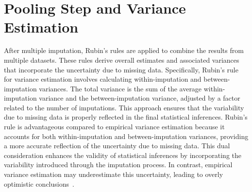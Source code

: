 \section{Pooling Step and Variance Estimation}
After multiple imputation, Rubin's rules are applied to combine the results from multiple datasets.
These rules derive overall estimates and associated variances that incorporate the uncertainty due to missing data.
Specifically, Rubin's rule for variance estimation involves calculating within-imputation and between-imputation variances.
The total variance is the sum of the average within-imputation variance and the between-imputation variance, adjusted by a factor related to the number of imputations.
This approach ensures that the variability due to missing data is properly reflected in the final statistical inferences.
Rubin's rule is advantageous compared to empirical variance estimation because it accounts for both within-imputation and between-imputation variances, providing a more accurate reflection of the uncertainty due to missing data.
This dual consideration enhances the validity of statistical inferences by incorporating the variability introduced through the imputation process. 
In contrast, empirical variance estimation may underestimate this uncertainty, leading to overly optimistic conclusions~\cite{rubin2018multiple}.

